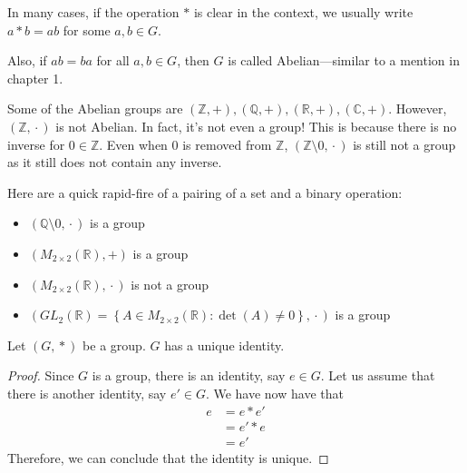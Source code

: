 \begin{remark}
    In many cases, if the operation \(*\) is clear in the context, we usually write \(a * b = ab\) for some \(a, b \in G\).

    Also, if \(ab = ba\) for all \(a, b \in G\), then \(G\) is called Abelian---similar to a mention in chapter 1.
\end{remark}

\begin{nexample}
    Some of the Abelian groups are \((\mathbb{Z}, +), (\mathbb{Q}, +), (\mathbb{R}, +), (\mathbb{C}, +)\). However, \((\mathbb{Z}, {}\cdot{})\) is not Abelian. In fact, it's not even a group! This is because there is no inverse for \(0 \in \mathbb{Z}\). Even when 0 is removed from \(\mathbb{Z}\), \((\mathbb{Z} \setminus 0, {}\cdot{})\) is still not a group as it still does not contain any inverse.
\end{nexample}

\begin{nexample}
    Here are a quick rapid-fire of a pairing of a set and a binary operation:
    \begin{itemize}
        \item \((\mathbb{Q} \setminus 0, {}\cdot{})\) is a group
        \item \(\left(M_{2 \times 2}(\mathbb{R}), +\right)\) is a group
        \item \(\left(M_{2 \times 2}(\mathbb{R}), {}\cdot{}\right)\) is not a group
        \item \(\left(GL_2(\mathbb{R}) = \left\{A \in M_{2 \times 2}(\mathbb{R}) : \det(A) \neq 0\right\}, {}\cdot{}\right)\) is a group
    \end{itemize}
\end{nexample}

\begin{theorem}
    Let \((G, {}*{})\) be a group. \(G\) has a unique identity.
\end{theorem}

\begin{proof}
    Since \(G\) is a group, there is an identity, say \(e \in G\). Let us assume that there is another identity, say \(e' \in G\). We have now have that
    \[
    \begin{aligned}
        e &= e * e' \\
          &= e' * e \\
          &= e'
    \end{aligned}
    \]
    Therefore, we can conclude that the identity is unique.
\end{proof}
